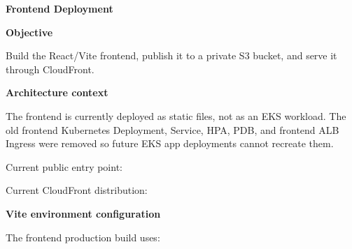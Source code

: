 \vspace{0.5em}\noindent\textbf{Frontend Deployment}\par

\vspace{0.5em}\noindent\textbf{Objective}\par

Build the React/Vite frontend, publish it to a private S3 bucket, and
serve it through CloudFront.

\vspace{0.5em}\noindent\textbf{Architecture context}\par

The frontend is currently deployed as static files, not as an EKS
workload. The old frontend Kubernetes Deployment, Service, HPA, PDB, and
frontend ALB Ingress were removed so future EKS app deployments cannot
recreate them.

Current public entry point:

\begin{Shaded}
\begin{Highlighting}[]
\end{Highlighting}
\end{Shaded}

Current CloudFront distribution:

\begin{Shaded}
\begin{Highlighting}[]
\end{Highlighting}
\end{Shaded}

\vspace{0.5em}\noindent\textbf{Vite environment
configuration}\par

The frontend production build uses:

